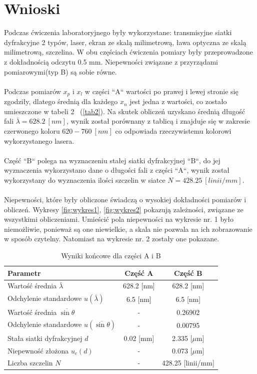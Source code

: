 \documentclass{article}
\begin{document}
\section{Wnioski}
\label{wnioski}
Podczas ćwiczenia laboratoryjnego były wykorzystane: transmisyjne siatki dyfrakcyjne 2 typów, laser, ekran ze skalą milimetrową, ława optyczna ze skalą milimetrową, szczelina.
W obu częściach ćwiczenia pomiary były przeprowadzone z dokładnością odczytu 0.5 mm. Niepewności związane z przyrządami pomiarowymi(typ B) są sobie równe. \\ \\
Podczas pomiarów \(x_{p}\) i \(x_{l}\) w części “A“ wartości po prawej i lewej stronie się zgodziły, dlatego średnią dla każdego \(x_n\) jest jedna z wartości, co zostało umieszczone w tabeli 2 \ (\cref{tab2}). Na skutek obliczeń uzyskano średnią długość fali \(\overline{\lambda}= 628.2 \ [nm]\), wynik został porównany z tablicą \cite[str. 219]{Tabf} i znajduje się w zakresie czerwonego koloru \(620-760\ [nm]\) co odpowiada rzeczywistemu kolorowi wykorzystanego lasera. \\ \\ 
Część “B“ polega na wyznaczeniu stałej siatki dyfrakcyjnej “B“, do jej wyznaczenia wykorzystano dane o długości fali z części “A“, wynik został wykorzystany do wyznaczenia ilości szczelin w siatce \(N= 428.25 \ [linii/mm]\). \\ \\
Niepewności, które były obliczone świadczą o wysokiej dokładności pomiarów i obliczeń. Wykresy \cref{fig:wykres1}, \cref{fig:wykres2} pokazują zależności, związane ze wszystkimi obliczeniami. Umieścić pola niepewności na wykresie nr. 1 było niemożliwie, ponieważ są one niewielkie, a skala nie pozwala na ich zobrazowanie w sposób czytelny. Natomiast na wykresie nr. 2 zostały one pokazane.

\begin{table}[h]
    \centering
    \renewcommand{\arraystretch}{1.5}
    \begin{tabular}{|l|c|c|}
        \hline
        Parametr & Część A & Część B \\ \hline
        Wartość średnia $\bar{\lambda}$ & 628.2 [nm] & 628.2 [nm] \\ \hline
        Odchylenie standardowe $u(\bar{\lambda})$ & 6.5 [nm] & 6.5 [nm] \\ \hline
        Wartość średnia $\overline{\sin\theta}$ & - & 0.26902 \\ \hline
        Odchylenie standardowe $u(\overline{\sin\theta})$ & - & 0.00795 \\ \hline
        Stała siatki dyfrakcyjnej $d$ & 0.02 [mm]  & 2.335 [$\mu$m] \\ \hline
        Niepewność złożona $u_c(d)$ & - & 0.073 [$\mu$m] \\ \hline
        Liczba szczelin $N$ & - & 428.25 [linii/mm] \\ \hline
    \end{tabular}
    \caption{Wyniki końcowe dla części A i B}
    \label{tab:wyniki}
\end{table}
\end{document}
